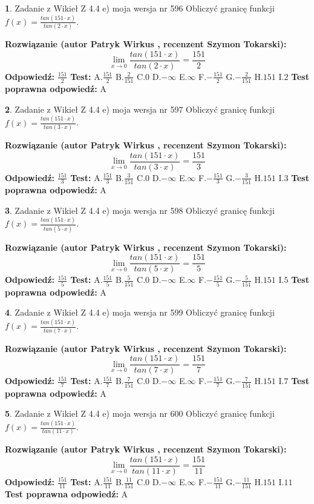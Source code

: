 \documentclass[12pt, a4paper]{article}
\theoremstyle{definition} %
\newtheorem{zad}{}
\newcommand{\zadStart}[1]{\begin{zad}#1\newline}
\newcommand{\zadStop}{\end{zad}}
\newcommand{\rozwStart}[2]{\noindent \textbf{Rozwiązanie (autor #1 , recenzent #2): }\newline}
\newcommand{\rozwStop}{\newline}
\newcommand{\odpStart}{\noindent \textbf{Odpowiedź:}\newline}
\newcommand{\odpStop}{\newline}
\newcommand{\testStart}{\noindent \textbf{Test:}\newline}
\newcommand{\testStop}{\newline}
\newcommand{\kluczStart}{\noindent \textbf{Test poprawna odpowiedź:}\newline}
\newcommand{\kluczStop}{\newline}
\begin{document}
\zadStart{Zadanie z Wikieł Z 4.4 e) moja wersja nr 596}
Obliczyć granicę funkcji $f(x)=\frac{tan(151\cdot x)}{tan(2\cdot x)}$.
\zadStop
\rozwStart{Patryk Wirkus}{Szymon Tokarski}
$$\lim\limits_{x\to 0}\frac{tan(151\cdot x)}{tan(2\cdot x)}=
\frac{151}{2}$$
\rozwStop
\odpStart
$\frac{151}{2}$
\odpStop
\testStart
A.$\frac{151}{2}$
B.$\frac{2}{151}$
C.$0$
D.$-\infty$
E.$\infty$
F.$-\frac{151}{2}$
G.$-\frac{2}{151}$
H.$151$
I.$2$
\testStop
\kluczStart
A
\kluczStop



\zadStart{Zadanie z Wikieł Z 4.4 e) moja wersja nr 597}
Obliczyć granicę funkcji $f(x)=\frac{tan(151\cdot x)}{tan(3\cdot x)}$.
\zadStop
\rozwStart{Patryk Wirkus}{Szymon Tokarski}
$$\lim\limits_{x\to 0}\frac{tan(151\cdot x)}{tan(3\cdot x)}=
\frac{151}{3}$$
\rozwStop
\odpStart
$\frac{151}{3}$
\odpStop
\testStart
A.$\frac{151}{3}$
B.$\frac{3}{151}$
C.$0$
D.$-\infty$
E.$\infty$
F.$-\frac{151}{3}$
G.$-\frac{3}{151}$
H.$151$
I.$3$
\testStop
\kluczStart
A
\kluczStop



\zadStart{Zadanie z Wikieł Z 4.4 e) moja wersja nr 598}
Obliczyć granicę funkcji $f(x)=\frac{tan(151\cdot x)}{tan(5\cdot x)}$.
\zadStop
\rozwStart{Patryk Wirkus}{Szymon Tokarski}
$$\lim\limits_{x\to 0}\frac{tan(151\cdot x)}{tan(5\cdot x)}=
\frac{151}{5}$$
\rozwStop
\odpStart
$\frac{151}{5}$
\odpStop
\testStart
A.$\frac{151}{5}$
B.$\frac{5}{151}$
C.$0$
D.$-\infty$
E.$\infty$
F.$-\frac{151}{5}$
G.$-\frac{5}{151}$
H.$151$
I.$5$
\testStop
\kluczStart
A
\kluczStop



\zadStart{Zadanie z Wikieł Z 4.4 e) moja wersja nr 599}
Obliczyć granicę funkcji $f(x)=\frac{tan(151\cdot x)}{tan(7\cdot x)}$.
\zadStop
\rozwStart{Patryk Wirkus}{Szymon Tokarski}
$$\lim\limits_{x\to 0}\frac{tan(151\cdot x)}{tan(7\cdot x)}=
\frac{151}{7}$$
\rozwStop
\odpStart
$\frac{151}{7}$
\odpStop
\testStart
A.$\frac{151}{7}$
B.$\frac{7}{151}$
C.$0$
D.$-\infty$
E.$\infty$
F.$-\frac{151}{7}$
G.$-\frac{7}{151}$
H.$151$
I.$7$
\testStop
\kluczStart
A
\kluczStop



\zadStart{Zadanie z Wikieł Z 4.4 e) moja wersja nr 600}
Obliczyć granicę funkcji $f(x)=\frac{tan(151\cdot x)}{tan(11\cdot x)}$.
\zadStop
\rozwStart{Patryk Wirkus}{Szymon Tokarski}
$$\lim\limits_{x\to 0}\frac{tan(151\cdot x)}{tan(11\cdot x)}=
\frac{151}{11}$$
\rozwStop
\odpStart
$\frac{151}{11}$
\odpStop
\testStart
A.$\frac{151}{11}$
B.$\frac{11}{151}$
C.$0$
D.$-\infty$
E.$\infty$
F.$-\frac{151}{11}$
G.$-\frac{11}{151}$
H.$151$
I.$11$
\testStop
\kluczStart
A
\kluczStop
\end{document}

